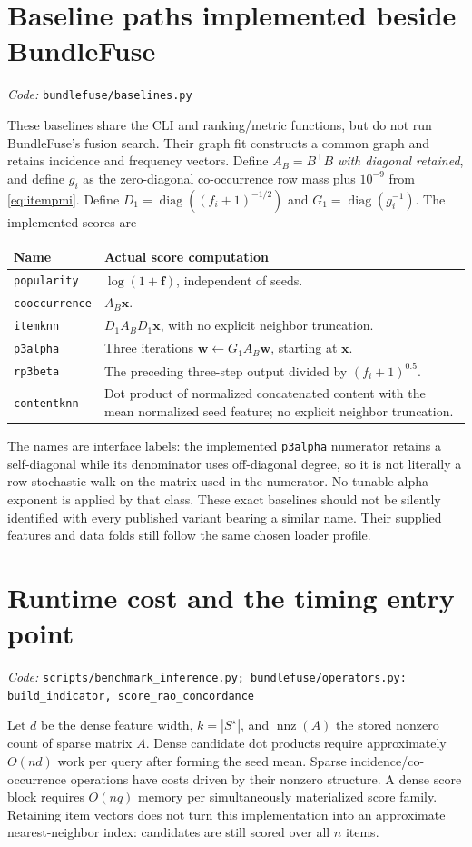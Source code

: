 \documentclass[11pt,a4paper]{article}
\newcommand{\code}[1]{\nolinkurl{#1}}
\newcommand{\src}[1]{\par\begingroup\raggedright\textit{Code: }\code{#1}\par\endgroup}
\newcommand{\diag}{\operatorname{diag}}
\newcommand{\nnz}{\operatorname{nnz}}
\numberwithin{equation}{section}
\begin{document}
\section{Baseline paths implemented beside BundleFuse}\label{app:baselines}
\src{bundlefuse/baselines.py}
These baselines share the CLI and ranking/metric functions, but do not run BundleFuse's
fusion search. Their graph fit constructs a common graph and retains incidence and
frequency vectors. Define $A_B=B^\top B$ \emph{with diagonal retained}, and define
$g_i$ as the zero-diagonal co-occurrence row mass plus $10^{-9}$ from
\eqref{eq:itempmi}. Define $D_1=\diag((f_i+1)^{-1/2})$ and
$G_1=\diag(g_i^{-1})$. The implemented scores are
\begin{center}\small
\begin{tabularx}{\linewidth}{@{}p{.23\linewidth}Y@{}}
\toprule Name & Actual score computation \\\midrule
\code{popularity} & $\log(1+\bm f)$, independent of seeds. \\
\code{cooccurrence} & $A_B\bm x$. \\
\code{itemknn} & $D_1A_BD_1\bm x$, with no explicit neighbor truncation. \\
\code{p3alpha} & Three iterations $\bm w\leftarrow G_1A_B\bm w$, starting at $\bm x$. \\
\code{rp3beta} & The preceding three-step output divided by $(f_i+1)^{0.5}$. \\
\code{contentknn} & Dot product of normalized concatenated content with the mean normalized seed feature; no explicit neighbor truncation. \\
\bottomrule
\end{tabularx}
\end{center}
The names are interface labels: the implemented \code{p3alpha} numerator retains a
self-diagonal while its denominator uses off-diagonal degree, so it is not literally a
row-stochastic walk on the matrix used in the numerator. No tunable alpha exponent is
applied by that class. These exact baselines should not be silently identified with every
published variant bearing a similar name. Their supplied features and data folds still
follow the same chosen loader profile.

\section{Runtime cost and the timing entry point}\label{app:runtime}
\src{scripts/benchmark_inference.py; bundlefuse/operators.py: build_indicator, score_rao_concordance}
Let $d$ be the dense feature width, $k=|S^\star|$, and $\nnz(A)$ the stored nonzero
count of sparse matrix $A$. Dense candidate dot products require approximately $O(nd)$
work per query after forming the seed mean. Sparse incidence/co-occurrence operations
have costs driven by their nonzero structure. A dense score block requires $O(nq)$
memory per simultaneously materialized score family. Retaining item vectors does not
turn this implementation into an approximate nearest-neighbor index: candidates are
still scored over all $n$ items.
\end{document}
